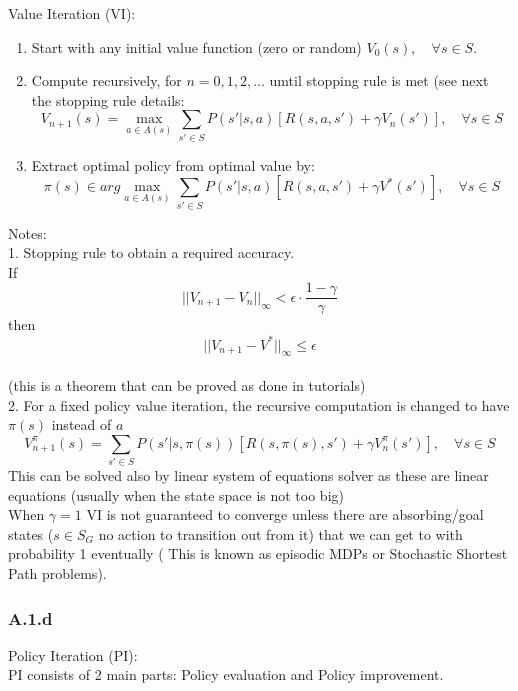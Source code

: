 \documentclass[12pt]{article}
\begin{document}
Value Iteration (VI):\\

\begin{enumerate}
  \item Start with any initial value function (zero or random) $V_0(s),\quad \forall s\in S$.
  \item Compute recursively, for $n = 0,1,2, \ldots $ umtil stopping rule is met (see next the stopping rule details:
          \[V_{n + 1}(s) = \max_{a\in A(s)} \sum_{s' \in S} P(s'|s,a)[R(s,a,s') + \gamma V_n(s')], \quad \forall s \in S\]
   \item Extract optimal policy from optimal value by:
   \[\pi(s) \in arg\max_{a\in A(s)} \sum_{s' \in S} P(s'|s,a)[R(s,a,s') + \gamma V^*(s')], \quad \forall s \in S\]
\end{enumerate}
Notes:\\
1. Stopping rule to obtain a required accuracy.\\
  If $$||V_{n+1}-V_{n}||_\infty < \epsilon \cdot \frac{1-\gamma}{\gamma}$$ then $$||V_{n+1} -
V^{*}||_\infty \leq \epsilon$$\\
(this is a theorem that can be proved as done in tutorials)\\
2. For a fixed policy value iteration, the recursive computation is changed to have $\pi(s)$ instead of $a$
$$V^{\pi}_{n + 1}(s) = \sum_{s' \in S} P(s'|s,\pi(s))[R(s,\pi(s),s') + \gamma V^{\pi}_n(s')], \quad \forall s \in S$$
This can be solved also by linear system of equations solver as these are linear equations (usually when the state space is not too big)\\

When $\gamma=1$ VI is not guaranteed to converge unless there are absorbing/goal states ($s\in S_G$ no action to transition out from it) that we can get to with probability 1 eventually ( This is known as episodic MDPs or Stochastic Shortest Path problems).

\subsubsection*{A.1.d}

Policy Iteration (PI):\\
PI consists of 2 main parts: Policy evaluation and Policy improvement.
\end{document}
